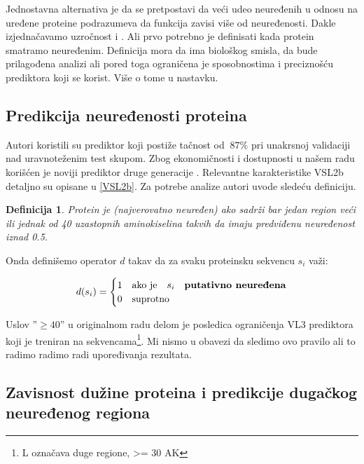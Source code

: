 Jednostavna alternativa je da se pretpostavi da veći udeo neuređenih u odnosu na
uređene proteine podrazumeva da funkcija zavisi više od neuređenosti.  Dakle
izjednačavamo uzročnost  i . Ali prvo
potrebno je definisati kada protein smatramo neuređenim.  Definicija mora da
ima biološkog smisla, da bude prilagođena analizi ali pored toga ograničena je
sposobnostima i preciznošću prediktora koji se korist.  Više o tome u nastavku.

\subsection{Predikcija neuređenosti proteina}

Autori \parencite{Xie2007} koristili su  prediktor koji
postiže tačnost od $~87\%$ pri unakrsnoj validaciji nad uravnoteženim test
skupom.  Zbog ekonomičnosti i dostupnosti u našem radu korišćen je noviji
prediktor druge generacije .
Relevantne karakteristike VSL2b detaljno su opisane u \ref{VSL2b}.
Za potrebe analize autori \parencite{Xie2007} uvode sledeću definiciju.

\newtheorem{mydef}{Definicija}
\begin{mydef}
\label{pdis_def}
Protein je (najverovatno neuređen) 
ako sadrži bar jedan region veći ili jednak od 40 uzastopnih aminokiselina
takvih da imaju \textit{predviđenu neuređenost} iznad 0.5. 
\end{mydef}

Onda definišemo operator $d$ takav da za svaku proteinsku sekvencu $s_i$ važi:

\[   
  d(s_i) = 
    \begin{cases}
      1 & \text{ako je} \quad s_i \quad \textbf{putativno neuređena}\\
      0 & \text{suprotno}
    \end{cases}
\]

Uslov ''$\ge40$'' u originalnom radu delom je posledica ograničenja VL3
prediktora koji je treniran na  sekvencama\footnote{L označava
duge regione, >= 30 AK}. Mi nismo u obavezi da sledimo ovo pravilo ali to
radimo radimo radi upoređivanja rezultata.

\subsection{Zavisnost dužine proteina i predikcije dugačkog neuređenog regiona}

